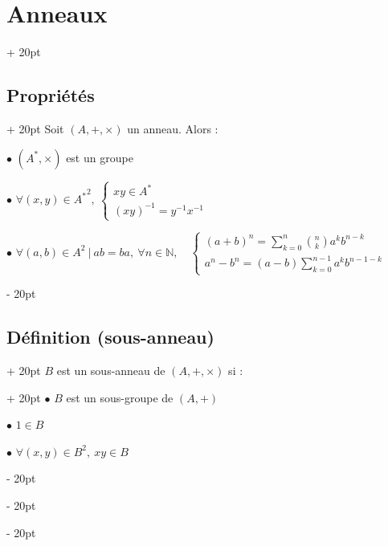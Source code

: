 \documentclass[a4paper, 12pt, twoside]{article}
\newcommand{\N}{\mathbb{N}} %
\newcommand{\ind}[1][20pt]{\advance\leftskip + #1}
\newcommand{\deind}[1][20pt]{\advance\leftskip - #1}
\newenvironment{indentedenv}[1][20pt]{\par \ind[#1]}{\par \deind}
\newenvironment{indt}[2][20pt]{#2 \begin{indentedenv}[#1]}{\end{indentedenv}} %
\begin{document}
\begin{indt}{\section{Anneaux}}
        \vspace{6pt}
        
        \begin{indt}{\subsection{Propriétés}}
            Soit $(A, +, \times)$ un anneau. Alors :
            
            \vspace{6pt}
            
            $\bullet$ $(A^*, \times)$ est un groupe
            
            $\bullet$
            $
                \forall (x, y) \in {A^*}^2,\
                \begin{cases}
                    xy \in A^*
                    \\
                    (xy)^{-1} = y^{-1} x^{-1}
                \end{cases}
            $
            
            $\bullet$
            $
                \forall (a, b) \in A^2\ |\ ab = ba,\
                \forall n \in \N,\quad
                \begin{cases}
                    \displaystyle
                    (a + b)^n = \sum_{k = 0}^n \binom{n}{k} a^k b^{n - k}
                    \\
                    \displaystyle
                    a^n - b^n = (a - b) \sum_{k = 0}^{n - 1} a^k b^{n - 1 - k}
                \end{cases}
            $
        \end{indt}
        
        \vspace{6pt}
        
        \begin{indt}{\subsection{Définition (sous-anneau)}}
            \begin{indt}{$B$ est un sous-anneau de $(A, +, \times)$ si :}
                $\bullet$ $B$ est un sous-groupe de $(A, +)$
                
                $\bullet$ $1 \in B$
                
                $\bullet$ $\forall (x, y) \in B^2,\ xy \in B$
            \end{indt}
        \end{indt}
        
    \end{indt}
    
\end{document}
